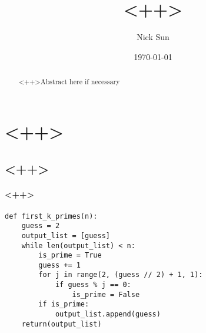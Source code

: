 \documentclass[10pt,a4paper]{article}
\title{\vspace{-2.0cm}<++>}
\date{\today}
\author{Nick Sun}
\begin{document}
\maketitle

\begin{abstract}
	<++>Abstract here if necessary
\end{abstract}

\section{<++>}

\subsection{<++>}

\paragraph{<++>}


\begin{lstlisting}
def first_k_primes(n):
	guess = 2
	output_list = [guess]
	while len(output_list) < n:
		is_prime = True
		guess += 1
		for j in range(2, (guess // 2) + 1, 1):
			if guess % j == 0:
				is_prime = False		
		if is_prime:
			output_list.append(guess)
	return(output_list)
\end{lstlisting}
\end{document}

